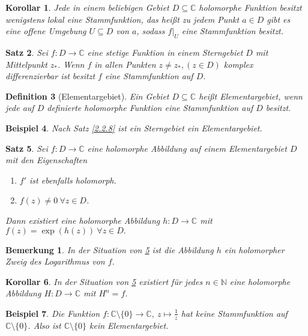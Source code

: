 \documentclass[a4paper,12pt]{article}
\theoremstyle{newthm}
\newtheorem{thm}{Satz}[subsection]
\newtheorem{cor}[thm]{Korollar}
\theoremstyle{newdef}
\newtheorem{defn}[thm]{Definition}
\theoremstyle{newrem}
\newtheorem{exmp}[thm]{Beispiel}
\newtheorem*{rem}{Bemerkung}
\newcommand{\N}{\mathbb{N}}
\newcommand{\C}{\mathbb{C}}
\newcommand{\bound}[2]{\left.#1\right|_{#2}}
\begin{document}
		\begin{cor}
			Jede in einem beliebigen Gebiet $ D \subseteq \C $ holomorphe Funktion besitzt wenigstens lokal eine Stammfunktion, das heißt zu jedem Punkt $ a \in D $ gibt es eine offene Umgebung $ U \subseteq D $ von $a$, sodass $ \bound{f}{U} $ eine Stammfunktion besitzt.
		\end{cor}
		
		\begin{thm}
			Sei $ f: D \to \C $ eine stetige Funktion in einem Sterngebiet $D$ mit Mittelpunkt $ z_* $. Wenn $f$ in allen Punkten $ z \neq z_*, (z \in D) $ komplex differenzierbar ist besitzt $f$ eine Stammfunktion auf $D$.
		\end{thm}
		
		\begin{defn}[Elementargebiet]
			Ein Gebiet $ D \subseteq \C $ heißt \emph{Elementargebiet}, wenn jede auf $D$ definierte holomorphe Funktion eine Stammfunktion auf $D$ besitzt.
		\end{defn}
		
		\begin{exmp}
			Nach Satz \ref{2.2.8} ist ein Sterngebiet ein Elementargebiet.
		\end{exmp}
		
		\begin{thm}\label{2.2.14}
			Sei $ f: D \to \C $ eine holomorphe Abbildung auf einem Elementargebiet $D$ mit den Eigenschaften
			\begin{enumerate}[label={\roman*})]
				\item $f'$ ist ebenfalls holomorph.
				\item $ f(z) \neq 0 \ \forall z \in D $.
			\end{enumerate}
			Dann existiert eine holomorphe Abbildung $ h: D \to \C $ mit $ f(z) = \exp(h(z)) \ \forall z \in D. $
		\end{thm}
		
		\begin{rem}
			In der Situation von \ref{2.2.14} ist die Abbildung $h$ ein holomorpher Zweig des Logarithmus von $f$.
		\end{rem}
		
		\begin{cor}
			In der Situation von \ref{2.2.14} existiert für jedes $ n \in \N $ eine holomorphe Abbildung $ H: D \to \C $ mit $ H^n = f $.
		\end{cor}
		
		\begin{exmp}
			Die Funktion $ f: \C \setminus\{0\} \to \C,\ z \mapsto \frac{1}{z} $ hat keine Stammfunktion auf $ \C \setminus\{0\} $. Also ist $ \C\setminus\{0\} $ kein Elementargebiet.
		\end{exmp}
		
\end{document}

